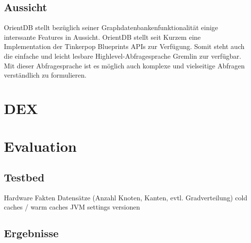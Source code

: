 \documentclass[11pt, a4paper, oneside, twocolumn]{article} %
\begin{document}
\subsection{Aussicht}
OrientDB stellt bezüglich seiner Graphdatenbankenfunktionalität einige interssante Features in Aussicht. OrientDB stellt seit Kurzem eine Implementation der Tinkerpop Blueprints APIs zur Verfügung. Somit steht auch die einfache und leicht lesbare Highlevel-Abfragesprache Gremlin zur verfügbar. Mit dieser Abfragesprache ist es möglich auch komplexe und vielseitige Abfragen verständlich zu formulieren.


\section{DEX}

\section{Evaluation}

\subsection{Testbed}

Hardware Fakten
Datensätze (Anzahl Knoten, Kanten, evtl. Gradverteilung)
cold caches / warm caches
JVM settings
versionen

\subsection{Ergebnisse}
\end{document}
